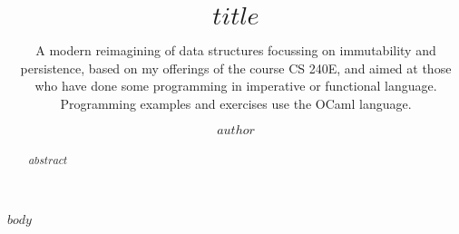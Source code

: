 \documentclass[acmsmall, nonacm, acmthm=false]{acmart}
\begin{document}
\title{$title$}
\subtitle{A modern reimagining of data structures focussing on immutability and persistence, based on my offerings of the course CS 240E, and aimed at those who have done some programming in imperative or functional language. Programming examples and exercises use the OCaml language.}

\author{$author$}



\begin{abstract}
    $abstract$
\end{abstract}

\tableofcontents
%
%



\maketitle

$body$



\end{document}
